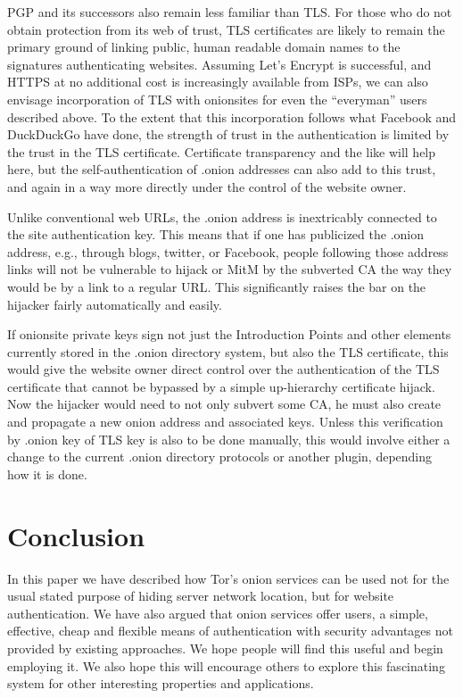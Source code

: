 \documentclass[10pt, conference, compsocconf]{styles/IEEEtran}
\begin{document}
PGP and its successors also remain less familiar than TLS. For those
who do not obtain protection from its web of trust, TLS certificates
are likely to remain the primary ground of linking public, human
readable domain names to the signatures authenticating
websites. Assuming Let's Encrypt is successful, and HTTPS at no
additional cost is increasingly available from ISPs, we can also
envisage incorporation of TLS with onionsites for even the
``everyman'' users described above.  To the extent that this
incorporation follows what Facebook and DuckDuckGo have done, the
strength of trust in the authentication is limited by the trust in the
TLS certificate. Certificate transparency and the
like will help here, but the self-authentication of .onion addresses
can also add to this trust, and again in a way more directly under the
control of the website owner.

Unlike conventional web URLs, the .onion address is inextricably connected to
the site authentication key. This means that if one has publicized the
.onion address, e.g., through blogs, twitter, or Facebook, people
following those address links will not be vulnerable to hijack or MitM
by the subverted CA the way they would be by a link to a regular
URL\@. This significantly raises the bar on the hijacker fairly
automatically and easily.

If onionsite private keys sign not just the Introduction Points and
other elements currently stored in the .onion directory system, but
also the TLS certificate, this would give the website owner direct
control over the authentication of the TLS certificate that cannot be
bypassed by a simple up-hierarchy certificate hijack. Now the hijacker
would need to not only subvert some CA, he must also create and
propagate a new onion address and associated keys. Unless this
verification by .onion key of TLS key is also to be done manually,
this would involve either a change to the current .onion directory
protocols or another plugin, depending how it is done.

\section{Conclusion}

In this paper we have described how Tor's onion services can be used
not for the usual stated purpose of hiding server network location,
but for website authentication.  We have also argued that onion
services offer users, a simple, effective, cheap and flexible means of
authentication with security advantages not provided by existing
approaches. We hope people will find this useful and begin employing
it. We also hope this will encourage others to explore this
fascinating system for other interesting properties and applications.
\end{document}
